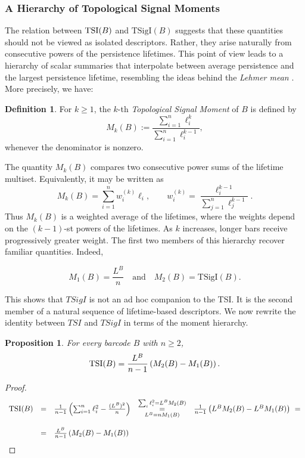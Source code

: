 \documentclass[11pt]{amsart}
\newtheorem{prop}{Proposition}[section]
\theoremstyle{definition}
\newtheorem{definition}{Definition}[section]
\newcommand{\tsi}[0]{\textup{TSI}}
\begin{document}
\subsubsection{A Hierarchy of Topological Signal Moments}

The relation between \(\tsi(B)\) and \(\text{TSigI}(B)\) suggests that these quantities should not be viewed as isolated descriptors. Rather, they arise naturally from consecutive powers of the persistence lifetimes. This point of view leads to a hierarchy of scalar summaries that interpolate between average persistence and the largest persistence lifetime, resembling the ideas behind the {\it Lehmer mean} \cite{LEHMER1971183}. More precisely, we have:

\begin{definition}
For \(k\geq 1\), the \(k\)-th \emph{Topological Signal Moment} of \(B\) is defined by
\[
M_k(B):=
\frac{\sum_{i=1}^{n}\ell_i^k}
{\sum_{i=1}^{n}\ell_i^{k-1}},
\]
whenever the denominator is nonzero.
\end{definition}

The quantity \(M_k(B)\) compares two consecutive power sums of the lifetime multiset. Equivalently, it may be written as
\[
M_k(B)
=
\sum_{i=1}^{n} w_i^{(k)}\ell_i,
\qquad
w_i^{(k)}
=
\frac{\ell_i^{k-1}}{\sum_{j=1}^{n}\ell_j^{k-1}}.
\]
Thus \(M_k(B)\) is a weighted average of the lifetimes, where the weights depend on the \((k-1)\)-st powers of the lifetimes. As \(k\) increases, longer bars receive progressively greater weight. The first two members of this hierarchy recover familiar quantities. Indeed,

\[
M_1(B)=\frac{L^B}{n} \quad \text{and} \quad M_2(B)=\text{TSigI}(B).
\]

This shows that \(TSigI\) is not an ad hoc companion to the TSI. It is the second member of a natural sequence of lifetime-based descriptors. We now rewrite the identity between \(TSI\) and \(TSigI\) in terms of the moment hierarchy.

\begin{prop}
For every barcode \(B\) with \(n\geq 2\),
\[
\tsi(B)
=
\frac{L^B}{n-1}
\left(
M_2(B)-M_1(B)
\right).
\]
\end{prop}

\begin{proof}
\[
\begin{array}{lclcl}
\tsi(B) & = & \frac{1}{n-1}\left(\sum_{i=1}^{n}\ell_i^2 -
\frac{(L^B)^2}{n}\right)  &\overset{\sum_i\ell_i^2=L^B M_2(B)}{\underset{L^B=n M_1(B)}{=}}& \frac{1}{n-1}\left(L^B M_2(B)-L^B M_1(B)\right)\ =\\
&&&&\\
& = &  \frac{L^B}{n-1}\left(M_2(B)-M_1(B)\right)&&
\end{array}
\]
\end{proof}
\end{document}
